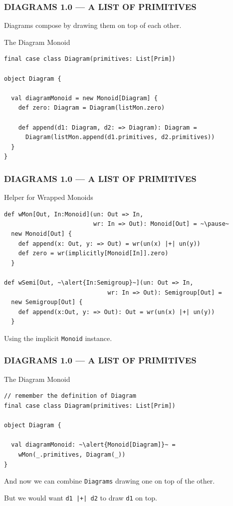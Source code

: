 \documentclass{beamer}
\begin{document}
\begin{frame}[fragile] \frametitle{DIAGRAMS 1.0 --- A LIST OF PRIMITIVES}
Diagrams compose by drawing them on top of each other.
  \begin{block}{The Diagram Monoid}
  \begin{lstlisting}
final case class Diagram(primitives: List[Prim])

object Diagram {

  val diagramMonoid = new Monoid[Diagram] {
    def zero: Diagram = Diagram(listMon.zero)

    def append(d1: Diagram, d2: => Diagram): Diagram =
      Diagram(listMon.append(d1.primitives, d2.primitives))
  }
}
  \end{lstlisting}
  \end{block}
\end{frame}

\begin{frame}[fragile] \frametitle{DIAGRAMS 1.0 --- A LIST OF PRIMITIVES}
  \begin{block}{Helper for Wrapped Monoids}
  \begin{lstlisting}
def wMon[Out, In:Monoid](un: Out => In,
                         wr: In => Out): Monoid[Out] = ~\pause~
  new Monoid[Out] {
    def append(x: Out, y: => Out) = wr(un(x) |+| un(y))
    def zero = wr(implicitly[Monoid[In]].zero)
  }

def wSemi[Out, ~\alert{In:Semigroup}~](un: Out => In,
                             wr: In => Out): Semigroup[Out] =
  new Semigroup[Out] {
    def append(x:Out, y: => Out): Out = wr(un(x) |+| un(y))
  }
  \end{lstlisting}
  \end{block}
Using the implicit \texttt{Monoid} instance.
\end{frame}

\begin{frame}[fragile] \frametitle{DIAGRAMS 1.0 --- A LIST OF PRIMITIVES}
  \begin{block}{The Diagram Monoid}
  \begin{lstlisting}
// remember the definition of Diagram
final case class Diagram(primitives: List[Prim])

object Diagram {

  val diagramMonoid: ~\alert{Monoid[Diagram]}~ =
    wMon(_.primitives, Diagram(_))
}
  \end{lstlisting}
  \end{block}

  And now we can combine \texttt{Diagrams} drawing one on top of the other.

  But we would want \alert{\texttt{d1 |+| d2} to draw \texttt{d1} on top.}
\end{frame}
\end{document}
